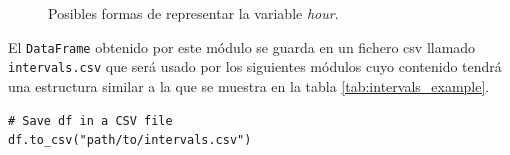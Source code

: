 \begin{enumerate}
   \begin{figure}[H]
  \centering
  \hfill
  \caption{Posibles formas de representar la variable \textit{hour}.}
  \label{fig:hour-stepvssignal}
\end{figure}
    
\end{enumerate}


El \small{\verb|DataFrame|} obtenido por este módulo se guarda en un fichero \acrshort{csv} llamado \small{\verb|intervals.csv|} que será usado por los siguientes módulos cuyo contenido tendrá una estructura similar a la que se muestra en la tabla \ref{tab:intervals_example}.

\begin{verbatim}
# Save df in a CSV file
df.to_csv("path/to/intervals.csv")
\end{verbatim}